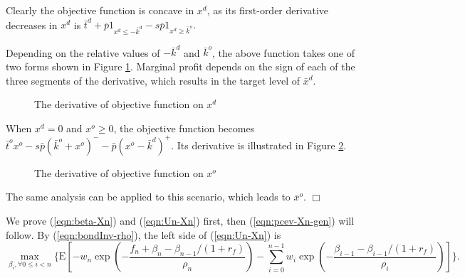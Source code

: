 \documentclass[mnsc,nonblindrev,copyedit]{informs2_wz} %
\newcommand{\E}{\mathrm{E}}
\newcommand{\qed}{ \hfill $\Box$ }
\begin{document}
Clearly the objective function is concave in $x^d$, as its first-order derivative decreases in $x^d$ is
    $\bar{t}^d +\bar{p}1_{x^d \leq -\bar{k}^d}-s\bar{p}1_{x^d \geq \bar{k}^o}.$

Depending on the relative values of $-\bar{k}^d$ and $\bar{k}^o$, the above function takes one of two forms shown in Figure \ref{figure:xdDeriveBasicModel}.  Marginal profit depends on the sign of each of the three segments of the derivative, which results in the target level of $\bar{x}^d$.
\begin{figure}[ht]
\begin{center}
\end{center}
    \caption{The derivative of objective function on $x^d$}
    \label{figure:xdDeriveBasicModel}
\end{figure}

When $x^d = 0$ and $x^o \geq 0$,  the objective function becomes $\bar{t}^o x^o - s\bar{p}(\bar{k}^o + x^o)^- - \bar{p}(x^o-\bar{k}^d)^+$.  Its derivative is illustrated in Figure \ref{figure:xoDeriveBasicModel}.
\begin{figure}[ht]
\begin{center}
\end{center}
    \caption{The derivative of objective function on $x^o$}
    \label{figure:xoDeriveBasicModel}
\end{figure}
The same analysis can be applied to this scenario, which leads to $\bar{x}^o$.  \qed

\medskip

We prove (\ref{eqn:beta-Xn}) and (\ref{eqn:Un-Xn}) first, then (\ref{eqn:pcev-Xn-gen}) will follow. By (\ref{eqn:bondInv-rho}), the left side of (\ref{eqn:Un-Xn}) is
\begin{equation*}
\max_{\beta_i, \forall 0 \leq i < n}\{\E[ -w_n \exp( - \frac{f_n + \beta_n - \beta_{n-1}/(1+r_f)}{\rho_n}) - \sum_{i=0}^{n-1}w_i \exp (-\frac{\beta_{i-1} -\beta_{i-1}/(1+r_f)}{\rho_i}) ]\}.
\end{equation*}
\end{document}
